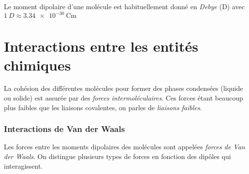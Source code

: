 \documentclass{cours}
\begin{document}
Le moment dipolaire d'une molécule est habituellement donné en \textit{Debye} (D) avec $\SI{1}{D} \approx \SI{3.34e-30}{\coulomb\meter} $ 

\section{Interactions entre les entités chimiques}%
\label{sec:interactions_entre_les_entites_chimiques}


La cohésion des différentes molécules pour former des phases condensées (liquide ou solide) est assurée par des \emph{forces intermoléculaires}. Ces forces étant beaucoup plus faibles que les liaisons covalentes, on parles de \emph{liaisons faibles}.

\subsubsection{Interactions de Van der Waals}%
\label{ssub:interactions_de_van_der_waals}
Les forces entre les moments dipolaires des molécules sont appelées \emph{forces de Van der Waals}. On distingue plusieurs types de forces en fonction des dipôles qui interagissent.
\end{document}
